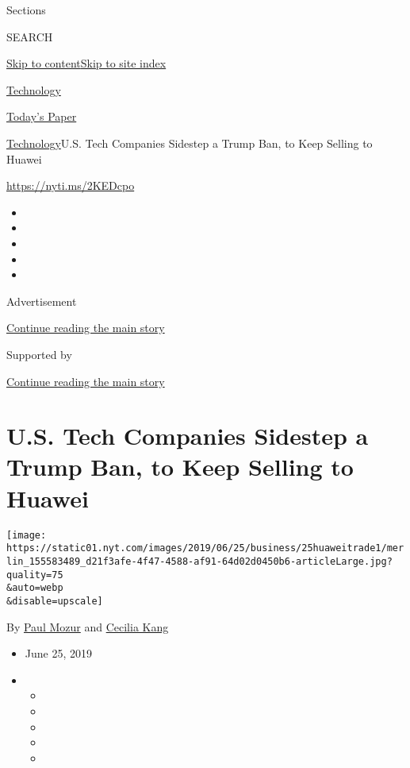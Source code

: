 Sections

SEARCH

\protect\hyperlink{site-content}{Skip to
content}\protect\hyperlink{site-index}{Skip to site index}

\href{https://www.nytimes.com/section/technology}{Technology}

\href{https://myaccount.nytimes.com/auth/login?response_type=cookie\&client_id=vi}{}

\href{https://www.nytimes.com/section/todayspaper}{Today's Paper}

\href{/section/technology}{Technology}\textbar{}U.S. Tech Companies
Sidestep a Trump Ban, to Keep Selling to Huawei

\url{https://nyti.ms/2KEDcpo}

\begin{itemize}
\item
\item
\item
\item
\item
\end{itemize}

Advertisement

\protect\hyperlink{after-top}{Continue reading the main story}

Supported by

\protect\hyperlink{after-sponsor}{Continue reading the main story}

\hypertarget{us-tech-companies-sidestep-a-trump-ban-to-keep-selling-to-huawei}{%
\section{U.S. Tech Companies Sidestep a Trump Ban, to Keep Selling to
Huawei}\label{us-tech-companies-sidestep-a-trump-ban-to-keep-selling-to-huawei}}

\texttt{[image: https://static01.nyt.com/images/2019/06/25/business/25huaweitrade1/merlin\_155583489\_d21f3afe-4f47-4588-af91-64d02d0450b6-articleLarge.jpg?quality=75\\\&auto=webp\\\&disable=upscale]}

By \href{https://www.nytimes.com/by/paul-mozur}{Paul Mozur} and
\href{https://www.nytimes.com/by/cecilia-kang}{Cecilia Kang}

\begin{itemize}
\item
  June 25, 2019
\item
  \begin{itemize}
  \item
  \item
  \item
  \item
  \item
  \end{itemize}
\end{itemize}


